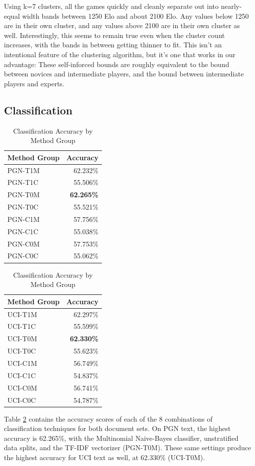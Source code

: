 \documentclass[conference]{IEEEtran}
\begin{document}
Using k=7 clusters, all the games quickly and cleanly separate out into nearly-equal width bands between 1250 Elo and about 2100 Elo. Any values below 1250 are in their own cluster, and any values above 2100 are in their own cluster as well. Interestingly, this seems to remain true even when the cluster count increases, with the bands in between getting thinner to fit. This isn't an intentional feature of the clustering algorithm, but it's one that works in our advantage: These self-inforced bounds are roughly equivalent to the bound between novices and intermediate players, and the bound between intermediate players and experts.

\subsection{Classification}
\begin{table}[]
\caption{Classification Accuracy by Method Group}
\centering
\begin{tabular}{lr}
\hline\hline
Method Group & Accuracy \\ [0.5ex]
\hline
PGN-T1M & 62.232\% \\
PGN-T1C & 55.506\% \\
PGN-T0M & \textbf{62.265\%} \\
PGN-T0C & 55.521\% \\
PGN-C1M & 57.756\% \\
PGN-C1C & 55.038\% \\
PGN-C0M & 57.753\% \\
PGN-C0C & 55.062\% \\ [1ex]
\hline
\end{tabular}
\begin{tabular}{lr}
\hline\hline
Method Group & Accuracy \\ [0.5ex]
\hline
UCI-T1M & 62.297\% \\
UCI-T1C & 55.599\% \\
UCI-T0M & \textbf{62.330\%} \\
UCI-T0C & 55.623\% \\
UCI-C1M & 56.749\% \\
UCI-C1C & 54.837\% \\
UCI-C0M & 56.741\% \\
UCI-C0C & 54.787\% \\ [1ex]
\hline
\end{tabular}
\label{table:class-results}
\end{table}

Table \ref{table:class-results} contains the accuracy scores of each of the 8 combinations of classification techniques for both document sets. On PGN text, the highest accuracy is 62.265\%, with the Multinomial Naive-Bayes classifier, unstratified data splits, and the TF-IDF vectorizer (PGN-T0M). These same settings produce the highest accuracy for UCI text as well, at 62.330\% (UCI-T0M).
\end{document}

